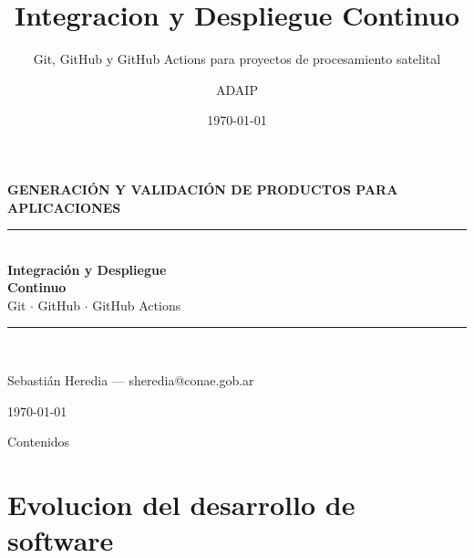 \documentclass[aspectratio=169]{beamer}
\title{Integracion y Despliegue Continuo}
\subtitle{Git, GitHub y GitHub Actions para proyectos de procesamiento satelital}
\author{ADAIP}
\institute{Area de Desarrollos Avanzados de Imagenes y Percepcion}
\date{\today}
\begin{document}
{
\begin{frame}[plain]
  \vspace{1cm}
  \begin{center}
    {\color{azulclaro}\large\textbf{GENERACIÓN Y VALIDACIÓN DE PRODUCTOS PARA APLICACIONES}}\\[0.3cm]
    \rule{8cm}{0.4pt}\\[0.5cm]
    {\color{white}\Huge\textbf{Integración y Despliegue}}\\[0.2cm]
    {\color{white}\Huge\textbf{Continuo}}\\[0.5cm]
    {\color{azulclaro}\large Git $\cdot$ GitHub $\cdot$ GitHub Actions}\\[1cm]
    \rule{8cm}{0.4pt}\\[0.5cm]
    {\color{gris!40}\small Sebastián Heredia --- sheredia@conae.gob.ar  
    
    \today}
  \end{center}
\end{frame}
}

\begin{frame}{Contenidos}
  \tableofcontents
\end{frame}

\section{Evolucion del desarrollo de software}
\end{document}
